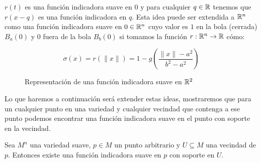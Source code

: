 \begin{example}
	$r(t)$ es una función indicadora suave en $0$  y para cualquier $q \in \mathbb{R}$ tenemos que $r(x-q)$ es una función indicadora en $q$. Esta idea puede ser extendida a $\mathbb{R}^n$ como una función indicadora suave en $0 \in \mathbb{R}^n$  cuyo valor es $1$ en la bola (cerrada) $B_a(0)$ y $0$ fuera de la bola $B_b(0)$ si tomamos la función $r: \mathbb{R}^n \to \mathbb{R}$ cómo:

	\[
		\sigma(x) = r(\|x\|) = 1 - g\left(\frac{\|x\| - a^2}{b^2 - a^2}\right)
	\]
\end{example}

\begin{figure}
	\centering
	
	\caption{Representación de una función indicadora suave en $\mathbb{R}^2$}
\end{figure}


Lo que haremos a continuación será extender estas ideas, mostraremos que para un cualquier punto en una variedad y cualquier vecindad que contenga a ese punto podemos encontrar una función indicadora suave en el punto con soporte en la vecindad.

\begin{lemma}\label{Lemma: Existencia de Función Indicadora}
	Sea $M^n$ una variedad suave, $p \in M$ un punto arbitrario y $U \subseteq M$ una vecindad de $p$. Entonces existe una función indicadora suave en $p$ con soporte en $U$.
\end{lemma}


